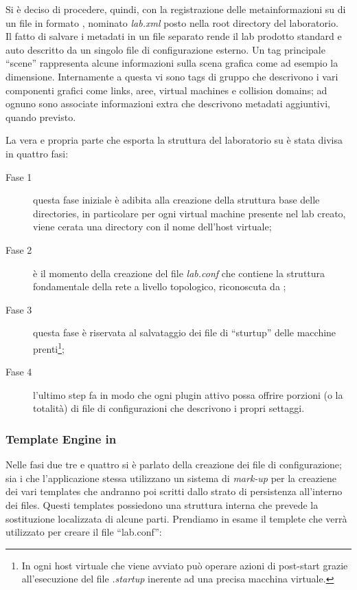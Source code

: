 Si è deciso di procedere, quindi, con la registrazione delle metainformazioni su di un file in formato \xml{}, nominato \emph{lab.xml} posto nella root directory del laboratorio.\\
Il fatto di salvare i metadati in un file separato rende il lab prodotto standard e auto descritto da un singolo file di configurazione esterno.
Un tag principale ``scene'' rappresenta alcune informazioni sulla scena grafica come ad esempio la dimensione. Internamente a questa vi sono tags di gruppo che descrivono i vari componenti grafici come links, aree, virtual machines e collision domains; ad ognuno sono associate informazioni extra che descrivono metadati aggiuntivi, quando previsto.

La vera e propria parte che esporta la struttura del laboratorio su \fs{} è stata divisa in quattro fasi:
\begin{description}
\item[Fase 1] questa fase iniziale è adibita alla creazione della struttura base delle directories, in particolare per ogni virtual machine presente nel lab creato, viene cerata una directory con il nome dell'host virtuale;
\item[Fase 2] è il momento della creazione del file \emph{lab.conf} che contiene la struttura fondamentale della rete a livello topologico, riconoscuta da \netkit{};
\item[Fase 3] questa fase è riservata al salvataggio dei file di ``sturtup'' delle macchine prenti\footnote{In \netkit{} ogni host virtuale che viene avviato può operare azioni di post-start grazie all'esecuzione del file \emph{.startup} inerente ad una precisa macchina virtuale.};
\item[Fase 4] l'ultimo step fa in modo che ogni plugin attivo possa offrire porzioni (o la totalità) di file di configurazioni che descrivono i propri settaggi.
\end{description}

\subsubsection*{Template Engine in \visualnetkit{}}
Nelle fasi due tre e quattro si è parlato della creazione dei file di configurazione; sia i \plugin{} che l'applicazione stessa utilizzano un sistema di \emph{mark-up} per la creaziene dei vari templates che andranno poi scritti dallo strato di persistenza all'interno dei files. Questi templates possiedono una struttura interna che prevede la sostituzione localizzata di alcune parti. Prendiamo in esame il templete che verrà utilizzato per creare il file ``lab.conf'':

